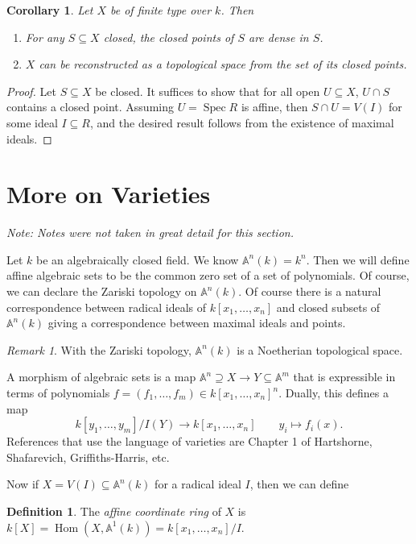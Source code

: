 \documentclass[leqno, openany]{memoir}
\newtheorem{cor}[thm]{Corollary}
\theoremstyle{definition}
\newtheorem{defn}[thm]{Definition}
\theoremstyle{remark}
\newtheorem{rmk}[thm]{Remark}
\theoremstyle{plain}
\theoremstyle{definition}
\theoremstyle{remark}
\newcommand{\A}{\mathbb{A}}
\DeclareMathOperator{\Hom}{Hom}
\DeclareMathOperator{\Spec}{Spec}
\begin{document}
\begin{cor}
    Let $X$ be of finite type over $k$. Then
    \begin{enumerate}
        \item For any $S \subseteq X$ closed, the closed points of $S$ are dense in $S$.
        \item $X$ can be reconstructed as a topological space from the set of its closed points.
    \end{enumerate}
\end{cor}

\begin{proof}
    Let $S \subseteq X$ be closed. It suffices to show that for all open $U \subseteq X$, $U \cap S$ contains a closed point. Assuming $U = \Spec R$ is affine, then $S \cap U = V(I)$ for some ideal $I \subseteq R$, and the desired result follows from the existence of maximal ideals.
\end{proof}

\section{More on Varieties}%
\label{sec:more_on_varieties}

\textit{Note: Notes were not taken in great detail for this section.} 

Let $k$ be an algebraically closed field. We know $\A^n(k) = k^n$. Then we will define affine algebraic sets to be the common zero set of a set of polynomials. Of course, we can declare the Zariski topology on $\A^n(k)$. Of course there is a natural correspondence between radical ideals of $k[x_1, \ldots, x_n]$ and closed subsets of $\A^n(k)$ giving a correspondence between maximal ideals and points.

\begin{rmk}
    With the Zariski topology, $\A^n(k)$ is a Noetherian topological space.
\end{rmk}

A morphism of algebraic sets is a map $\A^n \supseteq X \to Y \subseteq \A^m$ that is expressible in terms of polynomials $f = (f_1, \ldots, f_m) \in { k[x_1,\ldots, x_n] }^n$. Dually, this defines a map 
\[ k[y_1, \ldots, y_m]/I(Y) \to k[x_1, \ldots, x_n] \qquad y_i \mapsto f_i(x). \]
References that use the language of varieties are Chapter 1 of Hartshorne, Shafarevich, Griffiths-Harris, etc.

Now if $X = V(I) \subseteq \A^n(k)$ for a radical ideal $I$, then we can define
\begin{defn}
    The \textit{affine coordinate ring} of $X$ is $k[X] = \Hom(X, \A^1(k)) = k[x_1, \ldots, x_n] / I$.
\end{defn}
\end{document}
